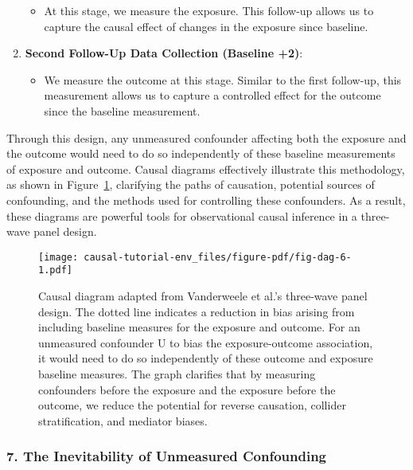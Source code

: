 \documentclass[
  singlecolumn]{article}
\providecommand{\tightlist}{%
  \setlength{\itemsep}{0pt}\setlength{\parskip}{0pt}}\usepackage{longtable,booktabs,array}
\begin{document}
\begin{enumerate}
  \begin{itemize}
  \tightlist
  \item
    At this stage, we measure the exposure. This follow-up allows us to
    capture the causal effect of changes in the exposure since baseline.
  \end{itemize}
\item
  \textbf{Second Follow-Up Data Collection (Baseline +2)}:

  \begin{itemize}
  \tightlist
  \item
    We measure the outcome at this stage. Similar to the first
    follow-up, this measurement allows us to capture a controlled effect
    for the outcome since the baseline measurement.
  \end{itemize}
\end{enumerate}

Through this design, any unmeasured confounder affecting both the
exposure and the outcome would need to do so independently of these
baseline measurements of exposure and outcome. Causal diagrams
effectively illustrate this methodology, as shown in
Figure~\ref{fig-dag-6}, clarifying the paths of causation, potential
sources of confounding, and the methods used for controlling these
confounders. As a result, these diagrams are powerful tools for
observational causal inference in a three-wave panel design.

\begin{figure}

{\centering \texttt{[image: causal-tutorial-env\_files/figure-pdf/fig-dag-6-1.pdf]}

}

\caption{\label{fig-dag-6}Causal diagram adapted from Vanderweele et
al.'s three-wave panel design. The dotted line indicates a reduction in
bias arising from including baseline measures for the exposure and
outcome. For an unmeasured confounder U to bias the exposure-outcome
association, it would need to do so independently of these outcome and
exposure baseline measures. The graph clarifies that by measuring
confounders before the exposure and the exposure before the outcome, we
reduce the potential for reverse causation, collider stratification, and
mediator biases.}

\end{figure}

\hypertarget{the-inevitability-of-unmeasured-confounding}{%
\subsubsection{7. The Inevitability of Unmeasured
Confounding}\label{the-inevitability-of-unmeasured-confounding}}
\end{document}
